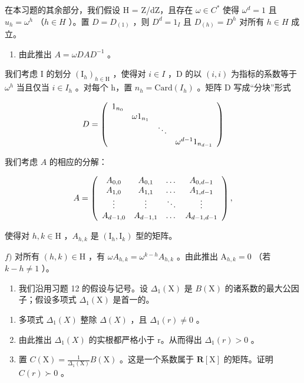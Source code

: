 在本习题的其余部分，我们假设 H = Z/dZ，且存在 \(\omega \in C^{*}\) 使得 \(\omega^{d} = 1\) 且 \(u_{h} = \omega^{h}\) （\(h \in H\) ）。置 \(D = D_{(1)}\) ，则 \(D^{d} = 1_{I}\) 且 \(D_{(h)} = D^{h}\) 对所有 \(h \in H\) 成立。

\begin{enumerate}
\def\labelenumi{\alph{enumi})}
\setcounter{enumi}{4}
\tightlist
\item
  由此推出 \(A = \omega DAD^{-1}\) 。
\end{enumerate}

我们考虑 I 的划分 \((\mathrm{I}_{h})_{h\in\mathrm{H}}\) ，使得对 \(i\in I\) ，D 的以 \((i,i)\) 为指标的系数等于 \(\omega^{h}\) 当且仅当 \(i\in I_{h}\) 。对每个 h，置 \(n_{h}=\mathrm{Card}(I_{h})\) 。矩阵 D 写成“分块”形式

\[
D = \left( \begin{array}{c c c c} 1 _ {n _ {0}} & & & \\ & \omega 1 _ {n _ {1}} & & \\ & & \ddots & \\ & & & \omega^ {d - 1} 1 _ {n _ {d - 1}} \end{array} \right)
\]

我们考虑 \(A\) 的相应的分解：

\[
A = \left( \begin{array}{c c c c} A _ {0, 0} & A _ {0, 1} & \dots & A _ {0, d - 1} \\ A _ {1, 0} & A _ {1, 1} & \dots & A _ {1, d - 1} \\ \vdots & \vdots & \ddots & \vdots \\ A _ {d - 1, 0} & A _ {d - 1, 1} & \dots & A _ {d - 1, d - 1} \end{array} \right),
\]

使得对 \(h, k \in \mathrm{H}\) ，\(A_{h,k}\) 是 \((\mathrm{I}_h, \mathrm{I}_k)\) 型的矩阵。

\(f)\) 对所有 \((h,k)\in\mathrm{H}\) ，有 \(\omega A_{h,k}=\omega^{k-h}A_{h,k}\) 。由此推出 \(\mathrm{A}_{h,k}=0\) （若 \(k-h\neq1\) ）。

\begin{enumerate}
\def\labelenumi{\arabic{enumi})}
\setcounter{enumi}{14}
\tightlist
\item
  我们沿用习题 12 的假设与记号。设 \(\Delta_1(\mathrm{X})\) 是 \(B(\mathrm{X})\) 的诸系数的最大公因子；假设多项式 \(\Delta_1(\mathrm{X})\) 是首一的。
\end{enumerate}

\begin{enumerate}
\def\labelenumi{\alph{enumi})}
\item
  多项式 \(\Delta_1(X)\) 整除 \(\Delta(X)\) ，且 \(\Delta_1(r) \neq 0\) 。
\item
  由此推出 \(\Delta_{1}(X)\) 的实根都严格小于 r。从而得出 \(\Delta_{1}(r)>0\) 。
\item
  置 \(C(\mathrm{X}) = \frac{1}{\Delta_1(\mathrm{X})} B(\mathrm{X})\) 。这是一个系数属于 \(\mathbf{R}[\mathrm{X}]\) 的矩阵。证明 \(C(r) \succ 0\) 。
\end{enumerate}

